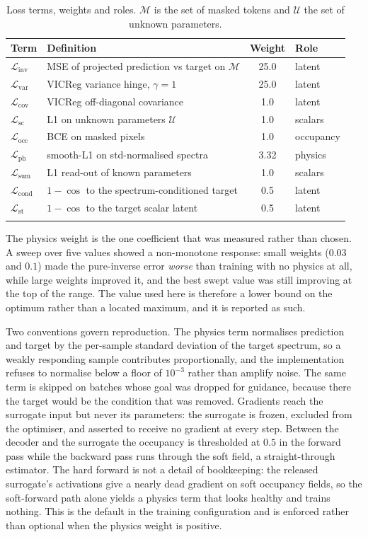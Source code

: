 \documentclass[pdflatex,oneside,sn-mathphys-num]{sn-jnl}
\theoremstyle{thmstyleone}
\theoremstyle{thmstyletwo}
\theoremstyle{thmstylethree}
\begin{document}
\begin{table}[h]
\centering
\caption{Loss terms, weights and roles. $\mathcal{M}$ is the set of masked tokens and
$\mathcal{U}$ the set of unknown parameters.}\label{tab:losses}
\begin{tabular}{@{}llcl@{}}
\toprule
Term & Definition & Weight & Role \\
\midrule
$\mathcal{L}_{\mathrm{inv}}$ & MSE of projected prediction vs target on $\mathcal{M}$ & 25.0 & latent \\
$\mathcal{L}_{\mathrm{var}}$ & VICReg variance hinge, $\gamma=1$ & 25.0 & latent \\
$\mathcal{L}_{\mathrm{cov}}$ & VICReg off-diagonal covariance & 1.0 & latent \\
$\mathcal{L}_{\mathrm{sc}}$ & L1 on unknown parameters $\mathcal{U}$ & 1.0 & scalars \\
$\mathcal{L}_{\mathrm{occ}}$ & BCE on masked pixels & 1.0 & occupancy \\
$\mathcal{L}_{\mathrm{ph}}$ & smooth-L1 on std-normalised spectra & 3.32 & physics \\
$\mathcal{L}_{\mathrm{sum}}$ & L1 read-out of known parameters & 1.0 & scalars \\
$\mathcal{L}_{\mathrm{cond}}$ & $1-\cos$ to the spectrum-conditioned target & 0.5 & latent \\
$\mathcal{L}_{\mathrm{st}}$ & $1-\cos$ to the target scalar latent & 0.5 & latent \\
\botrule
\end{tabular}
\end{table}

The physics weight is the one coefficient that was measured rather than chosen. A
sweep over five values showed a non-monotone response: small weights
($0.03$ and $0.1$) made the pure-inverse error \emph{worse} than training with no
physics at all, while large weights improved it, and the best swept value was still
improving at the top of the range. The value used here is therefore a lower bound on
the optimum rather than a located maximum, and it is reported as such.

Two conventions govern reproduction. The physics term normalises prediction and target
by the per-sample standard deviation of the target spectrum, so a weakly responding
sample contributes proportionally, and the implementation refuses to normalise below a
floor of $10^{-3}$ rather than amplify noise. The same term is skipped on batches whose
goal was dropped for guidance, because there the target would be the condition that was
removed. Gradients reach the surrogate input but never its parameters: the surrogate is
frozen, excluded from the optimiser, and asserted to receive no gradient at every step.
Between the decoder and the surrogate the occupancy is thresholded at $0.5$ in the forward
pass while the backward pass runs through the soft field, a straight-through estimator. The hard forward is not a detail of bookkeeping: the released surrogate's activations give a nearly dead
gradient on soft occupancy fields, so the soft-forward path alone yields a physics term
that looks healthy and trains nothing. This is the default in the training configuration
and is enforced rather than optional when the physics weight is positive.
\end{document}
